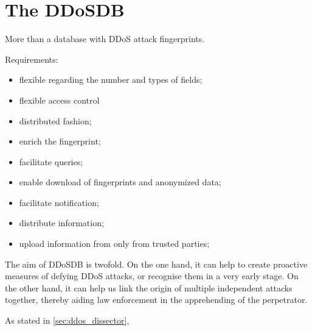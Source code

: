 \section{The DDoSDB}
\label{sec:ddosdb}

More than a database with DDoS attack fingerprints.


Requirements:
\begin{itemize}
	\item flexible regarding the number and types of fields; 
	\item flexible access control
	\item distributed fashion;
	\item enrich the fingerprint;
	\item facilitate queries;
	\item enable download of fingerprints and anonymized data;
	\item facilitate notification;
	\item distribute information;
	\item upload information from only from trusted parties;
\end{itemize}

The aim of DDoSDB is twofold. On the one hand, it can help to create proactive measures of defying DDoS attacks, or recognise them in a very early stage. On the other hand, it can help us link the origin of multiple independent attacks together, thereby aiding law enforcement in the apprehending of the perpetrator. 

As stated in \ref{sec:ddos_dissector}, 